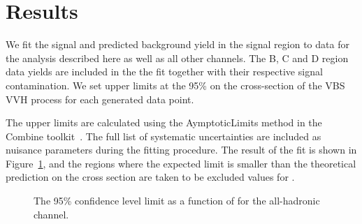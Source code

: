 \clearpage

\section{Results}
We fit the signal and predicted background yield in the signal region to data for the analysis described here as well as all other channels.
The B, C and D region data yields are included in the the fit together with their respective signal contamination.
We set upper limits at the 95\% \CL on the cross-section of the VBS VVH process for each \kVV generated data point.

The upper limits are calculated using the AymptoticLimits method in the Combine toolkit~\cite{Art:CombineAsymp}.
The full list of systematic uncertainties are included as nuisance parameters during the fitting procedure.
The result of the fit is shown in Figure~\ref{fig:vbsvvh_limit}, and the regions where the expected limit is smaller than the theoretical prediction on the cross section are taken to be excluded values for \kVV.

\begin{figure}[htb]
    \centering
    \caption{The 95\% confidence level limit as a function of \kVV for the all-hadronic channel. 
    }
    \label{fig:vbsvvh_limit}
\end{figure}
